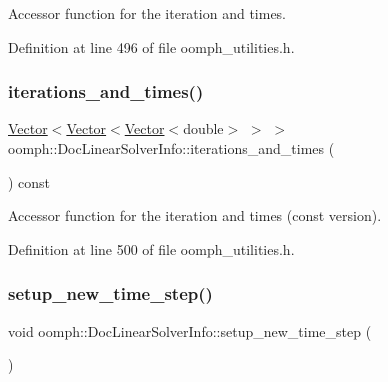 Accessor function for the iteration and times. 



Definition at line 496 of file oomph\+\_\+utilities.\+h.

\mbox{\label{classoomph_1_1DocLinearSolverInfo_afc670ed88962229cece84f7b8b2460ff}} 
\subsubsection{\texorpdfstring{iterations\+\_\+and\+\_\+times()}{iterations\_and\_times()}\hspace{0.1cm}{\footnotesize\ttfamily [2/2]}}
{\footnotesize\ttfamily \hyperlink{classoomph_1_1Vector}{Vector}$<$\hyperlink{classoomph_1_1Vector}{Vector}$<$\hyperlink{classoomph_1_1Vector}{Vector}$<$double$>$ $>$ $>$ oomph\+::\+Doc\+Linear\+Solver\+Info\+::iterations\+\_\+and\+\_\+times (\begin{DoxyParamCaption}{ }\end{DoxyParamCaption}) const\hspace{0.3cm}{\ttfamily [inline]}}



Accessor function for the iteration and times (const version). 



Definition at line 500 of file oomph\+\_\+utilities.\+h.

\mbox{\label{classoomph_1_1DocLinearSolverInfo_a09eb7f83980fc3a8e5cbd474ec1be4d4}} 
\subsubsection{\texorpdfstring{setup\+\_\+new\+\_\+time\+\_\+step()}{setup\_new\_time\_step()}}
{\footnotesize\ttfamily void oomph\+::\+Doc\+Linear\+Solver\+Info\+::setup\+\_\+new\+\_\+time\+\_\+step (\begin{DoxyParamCaption}{ }\end{DoxyParamCaption})\hspace{0.3cm}{\ttfamily [inline]}}



